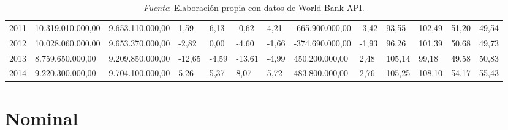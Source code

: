 \documentclass[a4paper,openright,12pt]{book}
\begin{document}
\begin{table}
{\begin{tabular}{lllllllllllll}
    2011 &                     10.319.010.000,00 &                      9.653.110.000,00 &                                          1,59 &                                          6,13 &                                      -0,62 &                                       4,21 &        -665.900.000,00 &                    -3,42 &                  93,55 &                102,49 &                                 51,20 &                   49,54 \\
    2012 &                     10.028.060.000,00 &                      9.653.370.000,00 &                                         -2,82 &                                          0,00 &                                      -4,60 &                                      -1,66 &        -374.690.000,00 &                    -1,93 &                  96,26 &                101,39 &                                 50,68 &                   49,73 \\
    2013 &                      8.759.650.000,00 &                      9.209.850.000,00 &                                        -12,65 &                                         -4,59 &                                     -13,61 &                                      -4,99 &         450.200.000,00 &                     2,48 &                 105,14 &                 99,18 &                                 49,58 &                   50,83 \\
    2014 &                      9.220.300.000,00 &                      9.704.100.000,00 &                                          5,26 &                                          5,37 &                                       8,07 &                                       5,72 &         483.800.000,00 &                     2,76 &                 105,25 &                108,10 &                                 54,17 &                   55,43 \\

    \bottomrule
\end{tabular}}
\caption*{\textit{Fuente}: Elaboración propia con datos de World Bank API.}
\end{table}

\section{Nominal}
\end{document}
